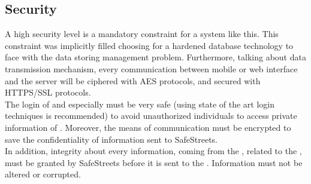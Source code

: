 \documentclass[../../../rasd.tex]{subfiles}
\begin{document}
\subsection{Security\label{sect:3.5.3}}

A high security level is a mandatory constraint for a system like this. This constraint was implicitly filled choosing for a hardened database technology to face with the data storing management problem. Furthermore, talking about data transmission mechanism, every communication between mobile or web interface and the server will be ciphered with AES protocols, and secured with HTTPS/SSL protocols. 
\\
The login of  and especially must be very safe (using state of the art login techniques is recommended) to avoid unauthorized individuals to access private information of . Moreover, the means of communication must be encrypted to save the confidentiality of information sent to SafeStreets. 
\\
In addition, integrity about every information, coming from the , related to the , must be granted by SafeStreets before it is sent to the . Information must not be altered or corrupted. 
\end{document}
